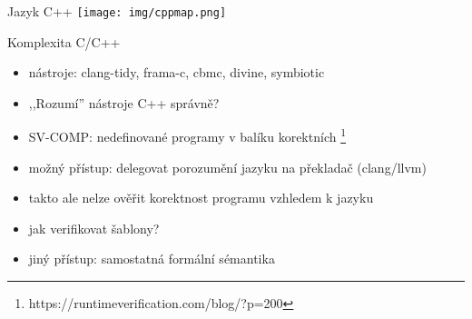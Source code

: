 \documentclass[11pt]{beamer}
\begin{document}
\begin{frame}{Jazyk C++}
\texttt{[image: img/cppmap.png]}
\end{frame}


%
%




\begin{frame}{Komplexita C/C++}
\begin{itemize}
\pause \item nástroje: clang-tidy, frama-c, cbmc, divine, symbiotic
\pause \item ,,Rozumí'' nástroje C++ správně?
\pause \item SV-COMP: nedefinované programy v balíku korektních \footnote[frame]{https://runtimeverification.com/blog/?p=200}
\pause \item možný přístup: delegovat porozumění jazyku na překladač (clang/llvm)
\pause \item takto ale nelze ověřit korektnost programu vzhledem k jazyku
\pause \item jak verifikovat šablony?
\pause \item jiný přístup: samostatná formální sémantika
\end{itemize}
\end{frame}
\end{document}
